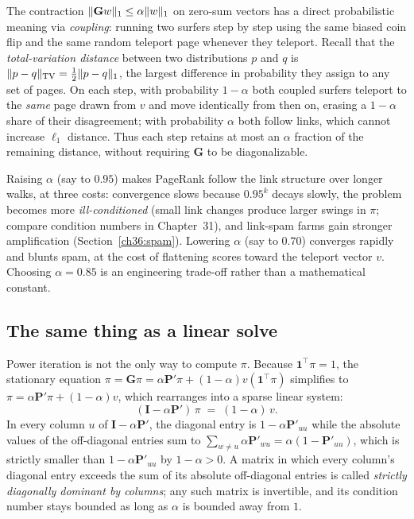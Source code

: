 \begin{whybox}
The contraction $\lVert\mathbf{G}w\rVert_1 \le \alpha\lVert w\rVert_1$ on zero-sum vectors has a direct probabilistic meaning via \emph{coupling}: running two surfers step by step using the same biased coin flip and the same random teleport page whenever they teleport. Recall that the \emph{total-variation distance} between two distributions $p$ and $q$ is $\lVert p - q\rVert_{\mathrm{TV}} = \tfrac{1}{2}\lVert p - q\rVert_1$, the largest difference in probability they assign to any set of pages. On each step, with probability $1-\alpha$ both coupled surfers teleport to the \emph{same} page drawn from $v$ and move identically from then on, erasing a $1-\alpha$ share of their disagreement; with probability $\alpha$ both follow links, which cannot increase $\ell_1$ distance. Thus each step retains at most an $\alpha$ fraction of the remaining distance, without requiring $\mathbf{G}$ to be diagonalizable.
\end{whybox}

\begin{trapbox}
Raising $\alpha$ (say to $0.95$) makes PageRank follow the link structure over longer walks, at three costs: convergence slows because $0.95^k$ decays slowly, the problem becomes more \emph{ill-conditioned} (small link changes produce larger swings in $\pi$; compare condition numbers in Chapter~31), and link-spam farms gain stronger amplification (Section~\ref{ch36:spam}). Lowering $\alpha$ (say to $0.70$) converges rapidly and blunts spam, at the cost of flattening scores toward the teleport vector $v$. Choosing $\alpha = 0.85$ is an engineering trade-off rather than a mathematical constant.
\end{trapbox}

\subsection{The same thing as a linear solve}
\label{ch36:linsolve}

Power iteration is not the only way to compute $\pi$. Because $\mathbf{1}^\top \pi = 1$, the stationary equation $\pi = \mathbf{G}\pi = \alpha\mathbf{P}'\pi + (1-\alpha)v(\mathbf{1}^\top \pi)$ simplifies to $\pi = \alpha\mathbf{P}'\pi + (1-\alpha)v$, which rearranges into a sparse linear system:
\[
  (\mathbf{I} - \alpha\mathbf{P}')\,\pi \;=\; (1-\alpha)\,v.
\]
In every column $u$ of $\mathbf{I}-\alpha\mathbf{P}'$, the diagonal entry is $1 - \alpha\mathbf{P}'_{uu}$ while the absolute values of the off-diagonal entries sum to $\sum_{w \ne u}\alpha\mathbf{P}'_{wu} = \alpha(1 - \mathbf{P}'_{uu})$, which is strictly smaller than $1 - \alpha\mathbf{P}'_{uu}$ by $1 - \alpha > 0$. A matrix in which every column's diagonal entry exceeds the sum of its absolute off-diagonal entries is called \emph{strictly diagonally dominant by columns}; any such matrix is invertible, and its condition number stays bounded as long as $\alpha$ is bounded away from $1$.

